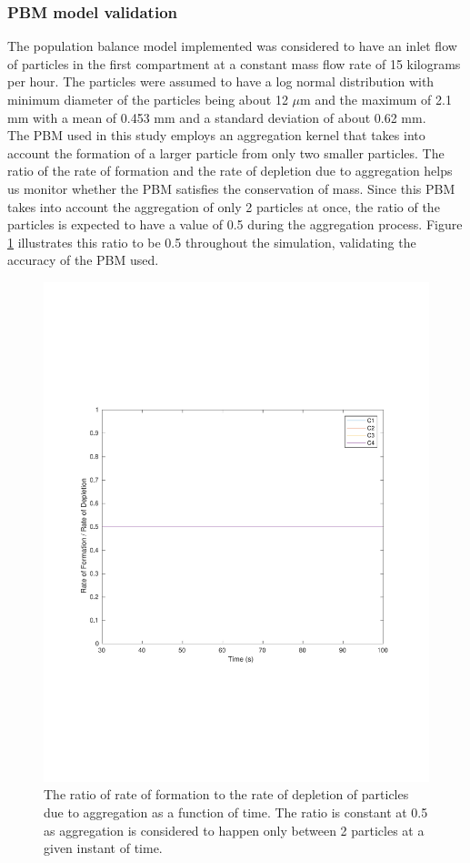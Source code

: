 \documentclass[preprint,11pt,authoryear]{elsarticle}
\begin{document}
\subsubsection{PBM model validation}
 The population balance model implemented was considered to have an inlet flow of particles in the 
first compartment at a constant mass flow rate of 15 kilograms per hour. The particles were assumed 
to have a log normal distribution with minimum diameter of the particles being about 12 $\mu$m and the 
maximum of 2.1 mm with a mean of 0.453 mm and a standard deviation of about 0.62 mm. \\
The PBM used in this study employs an aggregation kernel that takes into account the formation of a 
larger particle from only two smaller particles. The ratio of the rate of formation and the rate of 
depletion due to aggregation helps us monitor whether the PBM satisfies the conservation of mass. 
Since this PBM takes into account the aggregation of only 2 particles at once, the ratio of the particles 
is expected to have a value of 0.5 during the aggregation process. Figure \ref{fig:rslts_PBM_ratio_plot_2mm}
 illustrates this ratio to be 0.5 throughout the simulation, validating the accuracy of the PBM used.
\begin{figure}
\begin{center}
\includegraphics[scale=0.5]{rslts_PBM_2mm_validation.pdf}
\caption{The ratio of rate of formation to the rate of depletion of particles due to 
aggregation as a function of time. The ratio is constant at 0.5 as aggregation is 
considered to happen only between 2 particles at a given instant of time.}
\label{fig:rslts_PBM_ratio_plot_2mm}
\end{center}
\end{figure}
\end{document}
